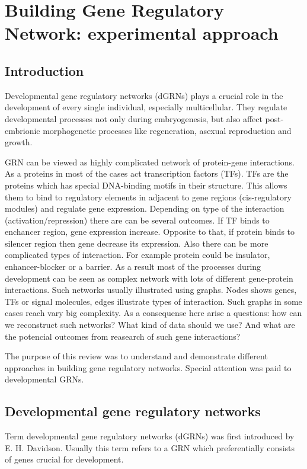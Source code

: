 \documentclass[a4paper, twoside]{report}
\begin{document}
\chapter*{Building Gene Regulatory Network: experimental approach}
\section*{Introduction}

Developmental gene regulatory networks (dGRNs) plays a crucial role in the development of every single individual, especially multicellular. 
They regulate developmental processes not only during embryogenesis, but also affect post-embrionic morphogenetic processes like regeneration, asexual reproduction and growth.

GRN can be viewed as highly complicated network of protein-gene interactions. 
As a proteins in most of the cases act transcription factors (TFs). 
TFs are the proteins which has special DNA-binding motifs in their structure. 
This allows them to bind to regulatory elements in adjacent to gene regions (cis-regulatory modules) and regulate gene expression.
Depending on type of the interaction (activation/repression) there are can be several outcomes.
If TF binds to enchancer region, gene expression increase.
Opposite to that, if protein binds to silencer region then gene decrease its expression.
Also there can be more complicated types of interaction. 
For example protein could be insulator, enhancer-blocker or a barrier.
As a result most of the processes during development can be seen as complex network with lots of different gene-protein interactions.
Such networks usually illustrated using graphs.  
Nodes shows genes, TFs or signal molecules, edges illustrate types of interaction.
Such graphs in some cases reach vary big complexity.
As a consequense here arise a questions: how can we reconstruct such networks? 
What kind of data should we use? 
And what are the potencial outcomes from reasearch of such gene interactions?

The purpose of this review was to understand and demonstrate different approaches in building gene regulatory networks.
Special attention was paid to developmental GRNs.  

\section*{Developmental gene regulatory networks}

Term developmental gene regulatory networks (dGRNs) was first introduced by E. H. Davidson.
Usually this term refers to a GRN which preferentially consists of genes crucial for development. 
\end{document}
